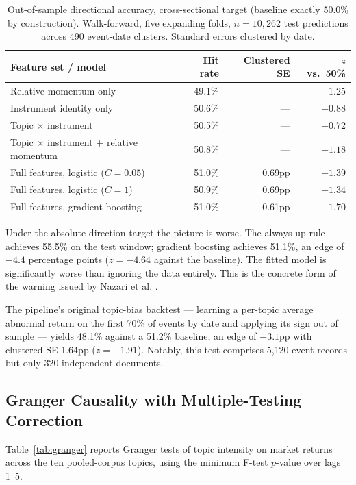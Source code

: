 \documentclass[11pt]{article}
\begin{document}
\begin{table}[H]
\centering
\caption{Out-of-sample directional accuracy, cross-sectional target (baseline exactly 50.0\% by construction). Walk-forward, five expanding folds, $n = 10{,}262$ test predictions across 490 event-date clusters. Standard errors clustered by date.}
\label{tab:main}
\begin{tabular}{lrrr}
\toprule
\textbf{Feature set / model} & \textbf{Hit rate} & \textbf{Clustered SE} & \textbf{$z$ vs.\ 50\%} \\
\midrule
Relative momentum only & 49.1\% & --- & $-1.25$ \\
Instrument identity only & 50.6\% & --- & $+0.88$ \\
Topic $\times$ instrument & 50.5\% & --- & $+0.72$ \\
Topic $\times$ instrument + relative momentum & 50.8\% & --- & $+1.18$ \\
\midrule
Full features, logistic ($C = 0.05$) & 51.0\% & 0.69pp & $+1.39$ \\
Full features, logistic ($C = 1$) & 50.9\% & 0.69pp & $+1.34$ \\
Full features, gradient boosting & 51.0\% & 0.61pp & $+1.70$ \\
\bottomrule
\end{tabular}
\end{table}

Under the absolute-direction target the picture is worse. The always-up rule achieves 55.5\% on the test window; gradient boosting achieves 51.1\%, an edge of $-4.4$ percentage points ($z = -4.64$ against the baseline). The fitted model is significantly worse than ignoring the data entirely. This is the concrete form of the warning issued by Nazari et al. \cite{nazari2025}.

The pipeline's original topic-bias backtest --- learning a per-topic average abnormal return on the first 70\% of events by date and applying its sign out of sample --- yields 48.1\% against a 51.2\% baseline, an edge of $-3.1$pp with clustered SE 1.64pp ($z = -1.91$). Notably, this test comprises 5{,}120 event records but only 320 independent documents.

\subsection{Granger Causality with Multiple-Testing Correction}

Table~\ref{tab:granger} reports Granger tests of topic intensity on market returns across the ten pooled-corpus topics, using the minimum F-test $p$-value over lags 1--5.
\end{document}
